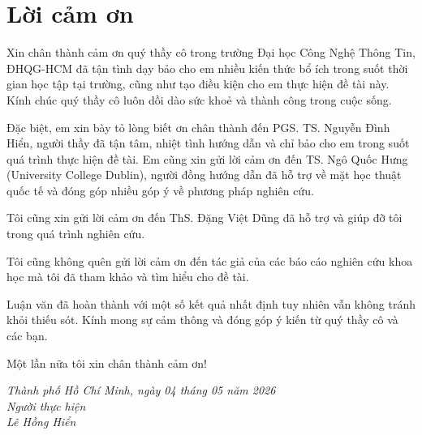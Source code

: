 \chapter*{\centering\Large{Lời cảm ơn}}

Xin chân thành cảm ơn quý thầy cô trong trường Đại học Công Nghệ Thông Tin, ĐHQG-HCM đã tận tình dạy bảo cho em nhiều kiến thức bổ ích trong suốt thời gian học tập tại trường, cũng như tạo điều kiện cho em thực hiện đề tài này. Kính chúc quý thầy cô luôn dồi dào sức khoẻ và thành công trong cuộc sống.

Đặc biệt, em xin bày tỏ lòng biết ơn chân thành đến PGS. TS. Nguyễn Đình Hiển, người thầy đã tận tâm, nhiệt tình hướng dẫn và chỉ bảo cho em trong suốt quá trình thực hiện đề tài. Em cũng xin gửi lời cảm ơn đến TS. Ngô Quốc Hưng (University College Dublin), người đồng hướng dẫn đã hỗ trợ về mặt học thuật quốc tế và đóng góp nhiều góp ý về phương pháp nghiên cứu.

Tôi cũng xin gửi lời cảm ơn đến ThS. Đặng Việt Dũng đã hỗ trợ và giúp đỡ tôi trong quá trình nghiên cứu.

Tôi cũng không quên gửi lời cảm ơn đến tác giả của các báo cáo nghiên cứu khoa học mà tôi đã tham khảo và tìm hiểu cho đề tài.

Luận văn đã hoàn thành với một số kết quả nhất định tuy nhiên vẫn không tránh khỏi thiếu sót. Kính mong sự cảm thông và đóng góp ý kiến từ quý thầy cô và các bạn.

Một lần nữa tôi xin chân thành cảm ơn!

\begin{flushright}
\textit{Thành phố Hồ Chí Minh, ngày 04 tháng 05 năm 2026} \\
\textit{Người thực hiện} \\[1cm]
\textit{Lê Hồng Hiển}
\end{flushright}
